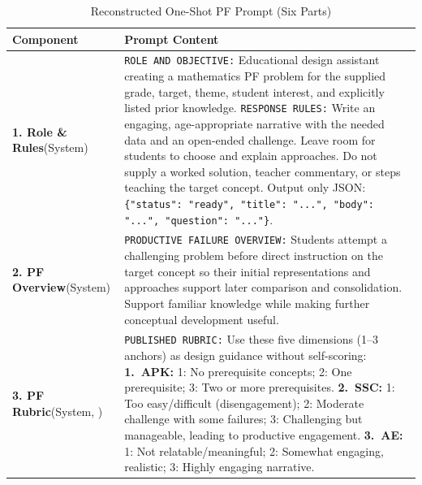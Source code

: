 {\begin{table}[!htbp]
\centering
\vspace{-0.5em}
\caption[Reconstructed One-Shot PF Prompt (Six Parts)]{Reconstructed One-Shot PF Prompt (Six Parts)}
\label{tab:app-oneshot-prompt}
\vspace{0.1em}
{\fontsize{7.5}{8.6}\selectfont
\setlength{\tabcolsep}{4pt}
\renewcommand{\arraystretch}{1.03}
\begin{tabular}{@{} >{\raggedright\arraybackslash}p{} >{\raggedright\arraybackslash}p{} @{}}
\toprule
\textbf{Component} & \textbf{Prompt Content} \\
\midrule
\textbf{1. Role \& Rules}\newline (System) &
\texttt{ROLE AND OBJECTIVE:} Educational design assistant creating a mathematics PF problem for the supplied grade, target, theme, student interest, and explicitly listed prior knowledge.\newline
\texttt{RESPONSE RULES:} Write an engaging, age-appropriate narrative with the needed data and an open-ended challenge. Leave room for students to choose and explain approaches. Do not supply a worked solution, teacher commentary, or steps teaching the target concept. Output only JSON: \texttt{\{"status": "ready", "title": "...", "body": "...", "question": "..."\}}. \\
\midrule
\textbf{2. PF Overview}\newline (System) &
\texttt{PRODUCTIVE FAILURE OVERVIEW:} Students attempt a challenging problem before direct instruction on the target concept so their initial representations and approaches support later comparison and consolidation. Support familiar knowledge while making further conceptual development useful. \\
\midrule
\textbf{3. PF Rubric}\newline (System, \cite{rahimi2025}) &
\texttt{PUBLISHED RUBRIC:} Use these five dimensions (1--3 anchors) as design guidance without self-scoring:\newline
\textbf{1.~APK:} 1: No prerequisite concepts; 2: One prerequisite; 3: Two or more prerequisites.\newline
\textbf{2.~SSC:} 1: Too easy/difficult (disengagement); 2: Moderate challenge with some failures; 3: Challenging but manageable, leading to productive engagement.\newline
\textbf{3.~AE:} 1: Not relatable/meaningful; 2: Somewhat engaging, realistic; 3: Highly engaging narrative.\newline

\end{tabular}}
\end{table}}
